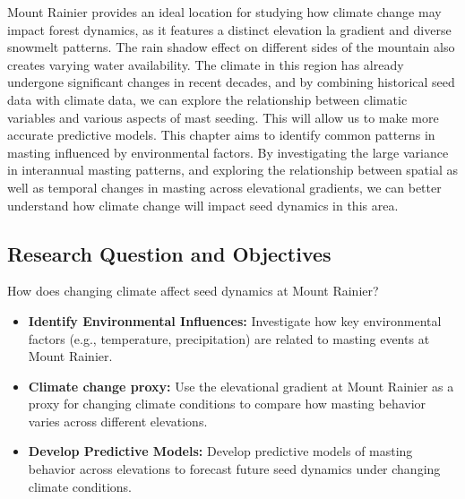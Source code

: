\documentclass[11pt,letter]{article}
\begin{document}
Mount Rainier provides an ideal location for studying how climate change may impact forest dynamics, as it features a distinct elevation la gradient and diverse snowmelt patterns. The rain shadow effect on different sides of the mountain also creates varying water availability. The climate in this region has already undergone significant changes in recent decades, and by combining historical seed data with climate data, we can explore the relationship between climatic variables and various aspects of mast seeding. This will allow us to make more accurate predictive models.
This chapter aims to identify common patterns in masting influenced by environmental factors. By investigating the large variance in interannual masting patterns, and exploring the relationship between spatial as well as temporal changes in masting across elevational gradients, we can better understand how climate change will impact seed dynamics in this area.\par
\subsection{Research Question and Objectives}
How does changing climate affect seed dynamics at Mount Rainier?
\begin{itemize}
\item\textbf{Identify Environmental Influences:} Investigate how key environmental factors (e.g., temperature, precipitation) are related to masting events at Mount Rainier.
\item\textbf{Climate change proxy:} Use the elevational gradient at Mount Rainier as a proxy for changing climate conditions to compare how masting behavior varies across different elevations.
\item\textbf{Develop Predictive Models:} Develop predictive models of masting behavior across elevations to forecast future seed dynamics under changing climate conditions.
\end{itemize}
\end{document}
